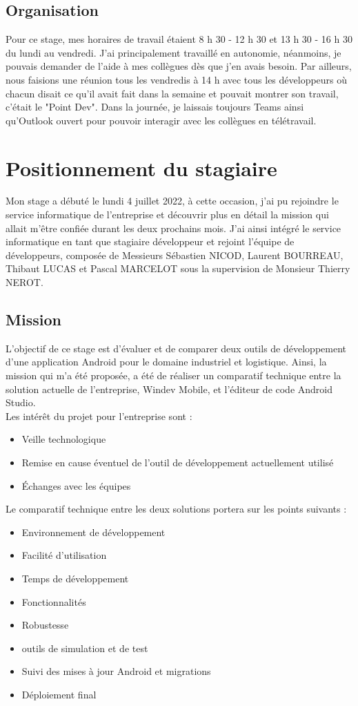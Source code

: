 \documentclass[a4paper, 12pt, french]{article}
\newcommand{\bdot}{\item[\color{ssiYellow}\ding{108}]}
\begin{document}
		\subsection{Organisation}
	Pour ce stage, mes horaires de travail étaient 8 h 30 - 12 h 30 et 13 h 30 - 16 h 30 du lundi au vendredi. J'ai principalement travaillé en autonomie, néanmoins, je pouvais demander de l'aide à mes collègues dès que j'en avais besoin. Par ailleurs, nous faisions une réunion tous les vendredis à 14 h avec tous les développeurs où chacun disait ce qu'il avait fait dans la semaine et pouvait montrer son travail, c'était le "Point Dev". Dans la journée, je laissais toujours Teams ainsi qu'Outlook ouvert pour pouvoir interagir avec les collègues en télétravail.\\

	\newpage

	\section{Positionnement du stagiaire}
		Mon stage a débuté le lundi 4 juillet 2022, à cette occasion, j'ai pu rejoindre le service informatique de l'entreprise et découvrir plus en détail la mission qui allait m'être confiée durant les deux prochains mois. J'ai ainsi intégré le service informatique en tant que stagiaire développeur et rejoint l'équipe de développeurs, composée de Messieurs Sébastien NICOD, Laurent BOURREAU, Thibaut LUCAS et Pascal MARCELOT sous la supervision de Monsieur Thierry NEROT.
		\subsection{Mission}
	L'objectif de ce stage est d'évaluer et de comparer deux outils de développement d'une application Android pour le domaine industriel et logistique. Ainsi, la mission qui m'a été proposée, a été de réaliser un comparatif technique entre la solution actuelle de l'entreprise, Windev Mobile, et l'éditeur de code Android Studio.\\

	\noindent
	Les intérêt du projet pour l'entreprise sont :
		\begin{itemize}
			\bdot{Veille technologique}
			\bdot{Remise en cause éventuel de l'outil de développement actuellement utilisé}
			\bdot{Échanges avec les équipes}
		\end{itemize}
	
	\vspace{\baselineskip}
	\noindent
	Le comparatif technique entre les deux solutions portera sur les points suivants :
		\begin{itemize}
			\bdot{Environnement de développement}
			\bdot{Facilité d'utilisation}
			\bdot{Temps de développement}
			\bdot{Fonctionnalités}
			\bdot{Robustesse}
			\bdot{outils de simulation et de test}
			\bdot{Suivi des mises à jour Android et migrations}
			\bdot{Déploiement final}
		\end{itemize}
	
\end{document}
